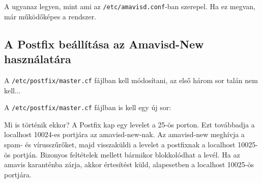 A  ugyanaz legyen, mint ami az \texttt{/etc/amavisd.conf}-ban szerepel. Ha ez megvan, már
működőképes a rendszer.

\subsection{A Postfix beállítása az Amavisd-New használatára}

A \texttt{/etc/postfix/master.cf} fájlban kell módosítani, az első három sor talán nem kell...


\noindent A \texttt{/etc/postfix/master.cf} fájlban is kell egy új sor:


Mi is történik ekkor? A Postfix kap egy levelet a 25-ös porton. Ezt továbbadja a localhost 10024-es portjára az
amavisd-new-nak. Az amavisd-new meghívja a spam- és vírusszűrőket, majd visszaküldi a levelet a postfixnak a
localhost 10025-ös portján. Bizonyos feltételek mellett bármikor blokkolódhat a levél. Ha az amavis karanténba zárja,
akkor értesítést küld, alapesetben a localhost 10025-ös portjára.

